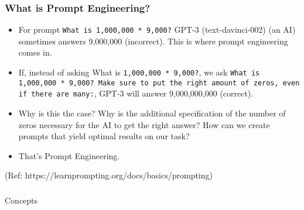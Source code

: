 \begin{frame}[fragile]\frametitle{What is Prompt Engineering?}

\begin{itemize}
\item For prompt \lstinline|What is 1,000,000 * 9,000?| GPT-3 (text-davinci-002) (an AI) sometimes answers 9,000,000 (incorrect). This is where prompt engineering comes in.
\item If, instead of asking What is \lstinline|1,000,000 * 9,000?|, we ask \lstinline|What is 1,000,000 * 9,000? Make sure to put the right amount of zeros, even if there are many:|, GPT-3 will answer 9,000,000,000 (correct). 
\item Why is this the case? Why is the additional specification of the number of zeros necessary for the AI to get the right answer? How can we create prompts that yield optimal results on our task? 			
\item That's Prompt Engineering.
\end{itemize}

{\tiny (Ref: https://learnprompting.org/docs/basics/prompting)}
\end{frame}

\begin{frame}[fragile]\frametitle{}
\begin{center}
{\Large Concepts}
\end{center}
\end{frame}


